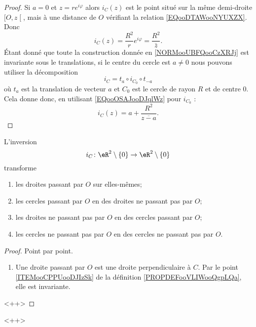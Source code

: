 \begin{proof}
    Si \( a=0\) et \( z=r e^{i\varphi}\) alors \( i_C(z)\) est le point situé sur la même demi-droite \( \mathopen[ O , z \mathclose[\), mais à une distance de \( O\) vérifiant la relation \eqref{EQooDTAWooNYUXZX}. Donc
        \begin{equation}        \label{EQooOSAJooDJqlWz}
            i_C(z)=\frac{ R^2 }{ r } e^{i\varphi}=\frac{ R^2 }{ \bar z }.
        \end{equation}
        Étant donné que toute la construction donnée en \ref{NORMooUBFQooCzXRJj} est invariante sous le translations, si le centre du cercle est \( a\neq 0\) nous pouvons utiliser la décomposition
        \begin{equation}
            i_C=t_a\circ i_{C_0}\circ t_{-a}
        \end{equation}
        où \( t_a\) est la translation de vecteur \( a\) et \( C_0\) est le cercle de rayon \( R\) et de centre \( 0\). Cela donne donc, en utilisant \eqref{EQooOSAJooDJqlWz} pour \( i_{C_0}\) :
        \begin{equation}
            i_C(z)=a+\frac{ R^2 }{ \overline{ z-a }  }.
        \end{equation}
\end{proof}

\begin{proposition}
    L'inversion
    \begin{equation}
        i_C\colon \eR^2\setminus\{ 0 \}\to \eR^2\setminus\{ 0 \}
    \end{equation}
    transforme
    \begin{enumerate}
        \item
            les droites passant par \( O\) sur elles-mêmes;
        \item
            les cercles passant par \( O\) en des droites ne passant pas par \( O\);
        \item
            les droites ne passant pas par \( O\) en des cercles passant par \( O\);
        \item
            les cercles ne passant pas par \( O\) en des cercles ne passant pas par \( O\).
    \end{enumerate}
\end{proposition}

\begin{proof}
    Point par point.
    \begin{enumerate}
        \item
            Une droite passant par \( O\) est une droite perpendiculaire à \( C\). Par le point \ref{ITEMooCPPUooDJIzSk} de la définition \ref{PROPDEFooVLIWooQgpLQa}, elle est invariante.
    \end{enumerate}
    <++>
\end{proof}
<++>

